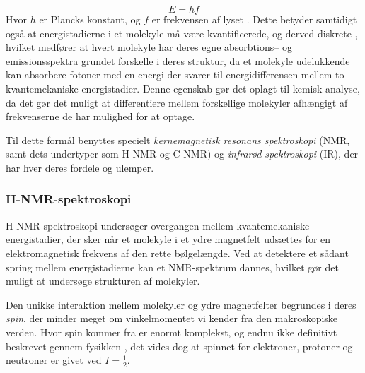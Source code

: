     \[
    E=hf
    \]
    Hvor $h$ er Plancks konstant, og $f$ er frekvensen af lyset \parencite{Giov2022}. Dette betyder samtidigt også at energistadierne i et molekyle må være kvantificerede, og derved diskrete \parencite{Erla2002}, hvilket medfører at hvert molekyle har deres egne absorbtions-- og emissionsspektra grundet forskelle i deres struktur, da et molekyle udelukkende kan absorbere fotoner med en energi der svarer til energidifferensen mellem to kvantemekaniske energistadier. Denne egenskab gør det oplagt til kemisk analyse, da det gør det muligt at differentiere mellem forskellige molekyler afhængigt af frekvenserne de har mulighed for at optage. 

    Til dette formål benyttes specielt \textit{kernemagnetisk resonans spektroskopi} (NMR, samt dets undertyper som H-NMR og C-NMR) og \textit{infrarød spektroskopi} (IR), der har hver deres fordele og ulemper. 

    \subsubsection{H-NMR-spektroskopi}
    H-NMR-spektroskopi undersøger overgangen mellem kvantemekaniske energistadier, der sker når et molekyle i et ydre magnetfelt udsættes for en elektromagnetisk frekvens af den rette bølgelængde. Ved at detektere et sådant spring mellem energistadierne kan et NMR-spektrum dannes, hvilket gør det muligt at undersøge strukturen af molekyler.

    Den unikke interaktion mellem molekyler og ydre magnetfelter begrundes i deres \textit{spin}, der minder meget om vinkelmomentet vi kender fra den makroskopiske verden. Hvor spin kommer fra er enormt komplekst, og endnu ikke definitivt beskrevet gennem fysikken \parencite{Edwi2015}, det vides dog at spinnet for elektroner, protoner og neutroner er givet ved $I=\frac{1}{2}$.

